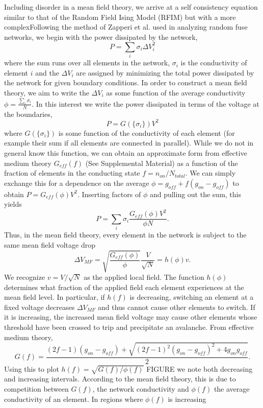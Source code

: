 \documentclass[aps,prl,preprint,groupedaddress]{revtex4-1}
\begin{document}
Including disorder in a mean field theory, we arrive at a self consistency
equation similar to that of the Random Field Ising Model (RFIM) but with a
more complexFollowing the method of Zapperi et al. \cite{Zapperi1999} used in analyzing
random fuse networks,
we begin with the power dissipated by the network,
\[P = \sum_i \sigma_i \Delta V_i^2\]
where the sum runs over all elements in the network, $\sigma_i$ is the 
conductivity of element $i$  and the $\Delta V_i$ are assigned by minimizing
the total power dissipated by the network for given boundary conditions.
In order to construct a mean field theory, we aim to write the $\Delta V_i$ as
some function of the average conductivity $\phi = \frac{\sum_i \sigma_i}{N}$.
In this interest we  write the power dissipated in terms of the voltage at
the boundaries,
\[P = G(\{\sigma_i\}) V^2\]
where $G(\{\sigma_i\})$ is some function of the conductivity of each element
(for example their sum if all elements are connected in parallel). While we
do not in general know this function, we can obtain an approximate form
from effective medium theory $G_{eff}(f)$ (See Supplemental Material) as a
function of the fraction of
elements in the conducting state $f = n_{on}/N_{total}$. We can simply
exchange this for a dependence on the average
\(\phi = g_{off} + f(g_{on} - g_{off})\) to obtain
$P = G_{eff}(\phi) V^2$. Inserting factors of $\phi$ and pulling out the sum,
this yields
\[P = \sum_i \sigma_i \frac{G_{eff}(\phi)V^2}{\phi N}.\]
Thus, in the mean field theory, every element in the network is subject to
the same mean field voltage drop
\[\Delta V_{MF} = \sqrt{\frac{G_{eff}(\phi)}{\phi}}\frac{V}{\sqrt{N}}
= h(\phi) v.\]
We recognize $v=V/\sqrt{N}$ as the applied local field.  The function
$h(\phi)$ determines what fraction of the applied field each element
experiences at the mean field level.  In particular, if $h(f)$ is decreasing,
switching an element at a fixed voltage decreases $\Delta V_{MF}$ and
thus cannot cause other elements to switch.  If it is increasing, the
increased mean field voltage may cause other elements whose threshold have
been crossed to trip and precipitate an avalanche. From effective medium
theory,
\[G(f) = \frac{(2f-1)(g_{on} - g_{off}) + \sqrt{(2f-1)^2
(g_{on} - g_{off})^2+ 4g_{on}g_{off}}}{2}.\]
Using this to plot $h(f) = \sqrt{G(f)/\phi(f)}$ FIGURE we note both decreasing
and increasing intervals.  According to the mean field theory, this is due
to competition between $G(f)$, the network conductivity and $\phi(f)$ the
average conductivity of an element.  In regions where $\phi(f)$ is increasing
\end{document}
